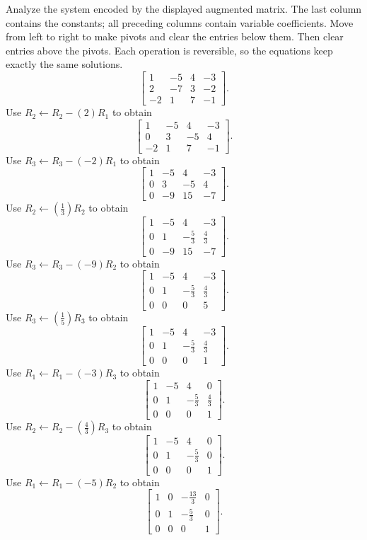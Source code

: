 \goal Analyze the system encoded by the displayed augmented matrix. The last column contains the constants; all preceding columns contain variable coefficients.
\idea Move from left to right to make pivots and clear the entries below them. Then clear entries above the pivots. Each operation is reversible, so the equations keep exactly the same solutions.
\[ \left[\begin{array}{rrr|r}1&-5&4&-3\\2&-7&3&-2\\-2&1&7&-1\end{array}\right].\]
Use $R_{2}\leftarrow R_{2}-(2)R_{1}$ to obtain
\[ \left[\begin{array}{rrr|r}1&-5&4&-3\\0&3&-5&4\\-2&1&7&-1\end{array}\right].\]
Use $R_{3}\leftarrow R_{3}-(-2)R_{1}$ to obtain
\[ \left[\begin{array}{rrr|r}1&-5&4&-3\\0&3&-5&4\\0&-9&15&-7\end{array}\right].\]
Use $R_{2}\leftarrow(\frac{1}{3})R_{2}$ to obtain
\[ \left[\begin{array}{rrr|r}1&-5&4&-3\\0&1&- \frac{5}{3}&\frac{4}{3}\\0&-9&15&-7\end{array}\right].\]
Use $R_{3}\leftarrow R_{3}-(-9)R_{2}$ to obtain
\[ \left[\begin{array}{rrr|r}1&-5&4&-3\\0&1&- \frac{5}{3}&\frac{4}{3}\\0&0&0&5\end{array}\right].\]
Use $R_{3}\leftarrow(\frac{1}{5})R_{3}$ to obtain
\[ \left[\begin{array}{rrr|r}1&-5&4&-3\\0&1&- \frac{5}{3}&\frac{4}{3}\\0&0&0&1\end{array}\right].\]
Use $R_{1}\leftarrow R_{1}-(-3)R_{3}$ to obtain
\[ \left[\begin{array}{rrr|r}1&-5&4&0\\0&1&- \frac{5}{3}&\frac{4}{3}\\0&0&0&1\end{array}\right].\]
Use $R_{2}\leftarrow R_{2}-(\frac{4}{3})R_{3}$ to obtain
\[ \left[\begin{array}{rrr|r}1&-5&4&0\\0&1&- \frac{5}{3}&0\\0&0&0&1\end{array}\right].\]
Use $R_{1}\leftarrow R_{1}-(-5)R_{2}$ to obtain
\[ \left[\begin{array}{rrr|r}1&0&- \frac{13}{3}&0\\0&1&- \frac{5}{3}&0\\0&0&0&1\end{array}\right].\]

